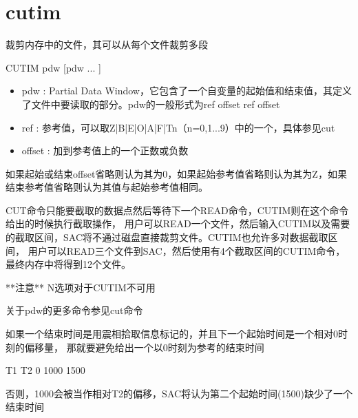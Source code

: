 \section{cutim}
\label{cmd:cutim}

裁剪内存中的文件，其可以从每个文件裁剪多段

CUTIM pdw [pdw ... ]

\begin{itemize}
\item pdw : Partial Data Window，它包含了一个自变量的起始值和结束值，其定义了文件中要读取的部分。pdw的一般形式为ref offset ref offset
\item ref : 参考值，可以取Z|B|E|O|A|F|Tn（n=0,1...9）中的一个，具体参见cut
\item offset : 加到参考值上的一个正数或负数 
\end{itemize}

如果起始或结束offset省略则认为其为0，如果起始参考值省略则认为其为Z，如果结束参考值省略则认为其值与起始参考值相同。

CUT命令只能要截取的数据点然后等待下一个READ命令，CUTIM则在这个命令给出的时候执行截取操作，
用户可以READ一个文件，然后输入CUTIM以及需要的截取区间，SAC将不通过磁盘直接裁剪文件。CUTIM也允许多对数据截取区间，
用户可以READ三个文件到SAC，然后使用有4个截取区间的CUTIM命令，最终内存中将得到12个文件。

**注意**  N选项对于CUTIM不可用

关于pdw的更多命令参见cut命令

如果一个结束时间是用震相拾取信息标记的，并且下一个起始时间是一个相对0时刻的偏移量，
那就要避免给出一个以0时刻为参考的结束时间

T1 T2 0 1000 1500

否则，1000会被当作相对T2的偏移，SAC将认为第二个起始时间(1500)缺少了一个	结束时间


